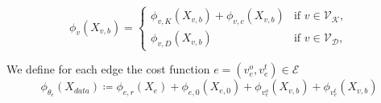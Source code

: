 \begin{equation}
    \label{vertex funcions}
    \phi_{v}(X_{v,b}) = \begin{cases} \phi_{v,K}  \left( X_{v,b} \right) +  \phi_{v,c}  \left( X_{v,b} \right)& \text{if } v \in \mathcal{V}_{\mathcal{K}}, \\ \phi_{v,D}  \left( X_{v,b} \right) & \text{if } v \in \mathcal{V}_{\mathcal{D}}, \end{cases}
\end{equation}


We define for each edge the cost function $e = (v^{o}_e, v^{t}_e) \in \mathcal{E}$
\begin{equation}
    \label{eq:cost:2}
    \phi_{\theta_e} \left( X_{data} \right) \coloneqq \phi_{e,r}  \left( X_e \right) + \phi_{e,0}  \left( X_{e,0} \right) + \phi_{v^{o}_e}(X_{v,b}) + \phi_{v^{t}_e}(X_{v,b})
\end{equation}